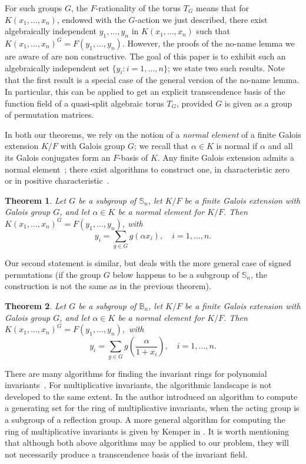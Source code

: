\documentclass[12pt]{article}
\theoremstyle{plain}
\newtheorem{theorem}{Theorem}
\begin{document}
For such groups $G$, the $F$-rationality of the torus $T_{G}$ means
that for $K(x_1,\dots,x_n)$, endowed with the $G$-action we just
described, there exist algebraically independent $y_1,\dots,y_n$ in 
$K(x_1,\dots,x_n)$ such that $K(x_1,\dots,x_n)^G=F(y_1,\dots,y_n)$. 
However, the proofs of the no-name lemma we are aware of
are non constructive.  The goal of this paper is to exhibit such 
an algebraically independent set $\{y_i:i=1,\dots,n\}$; we
state two such results. Note that the first result is a special case of
 the general version of the no-name lemma. In particular, this can be 
 applied to get an explicit transcendence basis of the function field 
 of a quasi-split algebraic torus $T_G$, provided $G$ is given as a group 
 of permutation matrices.

In both our theorems, we rely on the notion of a {\em normal element} of
a finite Galois extension $K/F$ with Galois group $G$; we recall that
$\alpha \in K$ is normal if $\alpha$ and all its Galois conjugates
form an $F$-basis of $K$.  Any finite Galois extension admits a normal
element~\cite[Theorem 6.13.1]{Lang}; there exist algorithms to
construct one, in characteristic zero~\cite{Girstmair} or in positive
characteristic~\cite{Giesbrecht,Poli}.

\begin{theorem}\label{nonamenonsign}
  Let $G$ be a subgroup of $\mathbb{S}_n$, let $K/F$ be a finite
  Galois extension with Galois group $G$, and let $\alpha \in K$ be a
  normal element for $K/F$. Then $ K(x_1,\ldots ,
  x_n)^G=F(y_1,\dots,y_n)$, with
  $$y_i =\sum_{g \in G} g(\alpha x_i), \quad i = 1,\dots,n.$$
\end{theorem}

Our second statement is similar, but deals with the more general case
of signed permutations (if the group $G$ below happens to be a subgroup of $\mathbb{S}_n$,  
the construction is not the same as in the previous theorem).

\begin{theorem}\label{nonamesign}
  Let $G$ be a subgroup of $\mathbb{B}_n$, let $K/F$ be a finite
  Galois extension with Galois group $G$, and let $\alpha \in K$ be a
  normal element for $K/F$. Then
  $K(x_1,\ldots, x_n)^G = F(y_1, \ldots, y_{n}),$
  with $$y_i = \sum_{g \in G} g\left (\frac{\alpha}{1+x_i}\right), \quad i = 1,\dots,n.$$
\end{theorem}

There are many algorithms for finding the invariant rings for
polynomial invariants~\cite{Sturmfels,Kemper2}. For multiplicative
invariants, the algorithmic landscape is not developed to the same
extent. In \cite{Renault} the author introduced an algorithm to 
compute a generating set for the ring of multiplicative invariants, 
when the acting group is a subgroup of a reflection group. A more 
general algorithm for computing the ring of multiplicative invariants
 is given by Kemper in \cite{Kemper}. It is worth mentioning that although 
both above algorithms may be applied to our problem, they 
will not necessarily produce a transcendence basis of the invariant field. 
\end{document}
